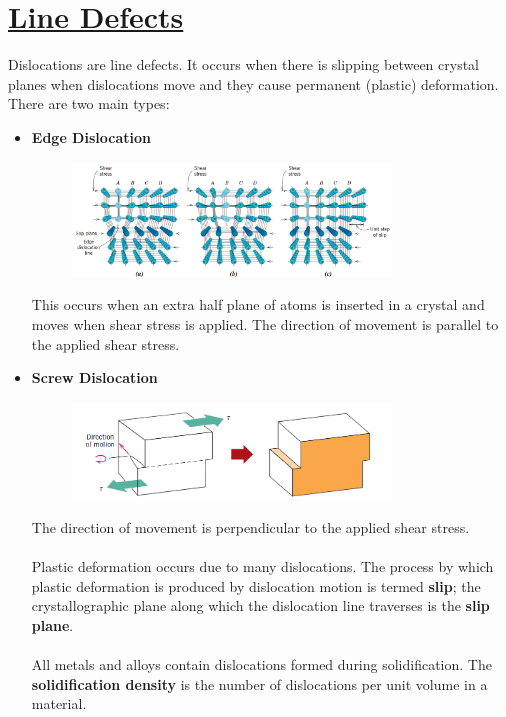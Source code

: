\documentclass[12pt]{article}
\begin{document}
\section*{\LARGE\underline{Line Defects}}
Dislocations are line defects. It occurs when there is slipping between crystal planes when dislocations move and they cause permanent (plastic) deformation. There are two main types:
\begin{itemize}
    \item \textbf{Edge Dislocation}
    \begin{figure}[H]   
        \centering
        \includegraphics[width=0.8\textwidth]{Edge dislocation.png}
    \end{figure}
    This occurs when an extra half plane of atoms is inserted in a crystal and moves when shear stress is applied. The direction of movement is parallel to the applied shear stress.
    \item \textbf{Screw Dislocation}
    \begin{figure}[H]
        \centering
        \includegraphics[width=0.8\textwidth]{screw dislocation.png}
    \end{figure}
    The direction of movement is perpendicular to the applied shear stress.\\\\
Plastic deformation occurs due to many dislocations. The process by which plastic deformation is produced by dislocation motion is termed \textbf{slip}; the crystallographic plane along which the dislocation line traverses is the \textbf{slip plane}.\\\\
All metals and alloys contain dislocations formed during solidification. The \textbf{solidification density} is the number of dislocations per unit volume in a material.
\end{itemize}
\end{document}
